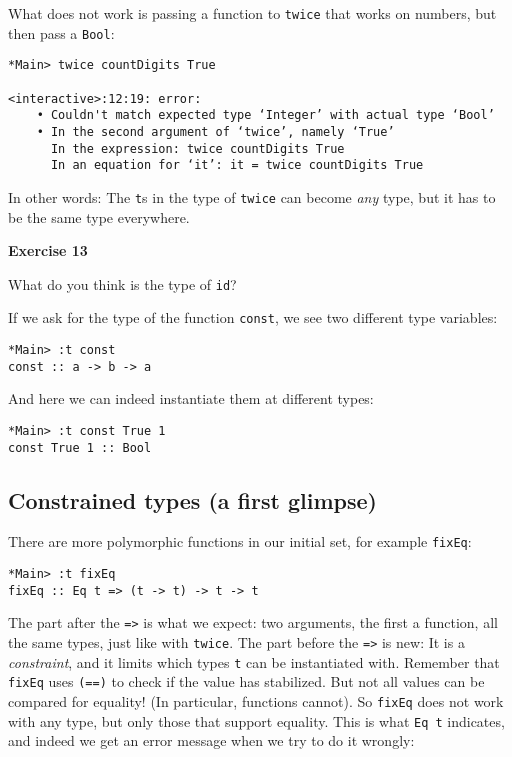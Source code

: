 \documentclass[11pt,
  american,
  DIV13]{article}
\begin{document}
What does not work is passing a function to \texttt{twice} that works on
numbers, but then pass a \texttt{Bool}:

\begin{verbatim}
*Main> twice countDigits True

<interactive>:12:19: error:
    • Couldn't match expected type ‘Integer’ with actual type ‘Bool’
    • In the second argument of ‘twice’, namely ‘True’
      In the expression: twice countDigits True
      In an equation for ‘it’: it = twice countDigits True
\end{verbatim}

In other words: The \texttt{t}s in the type of \texttt{twice} can become
\emph{any} type, but it has to be the same type everywhere.

\textbf{Exercise 13}

What do you think is the type of \texttt{id}?

If we ask for the type of the function \texttt{const}, we see two
different type variables:

\begin{verbatim}
*Main> :t const
const :: a -> b -> a
\end{verbatim}

And here we can indeed instantiate them at different types:

\begin{verbatim}
*Main> :t const True 1
const True 1 :: Bool
\end{verbatim}

\hypertarget{constrained-types-a-first-glimpse}{%
\subsection{Constrained types (a first
glimpse)}\label{constrained-types-a-first-glimpse}}

There are more polymorphic functions in our initial set, for example
\texttt{fixEq}:

\begin{verbatim}
*Main> :t fixEq
fixEq :: Eq t => (t -> t) -> t -> t
\end{verbatim}

The part after the \texttt{=\textgreater{}} is what we expect: two
arguments, the first a function, all the same types, just like with
\texttt{twice}. The part before the \texttt{=\textgreater{}} is new: It
is a \emph{constraint}, and it limits which types \texttt{t} can be
instantiated with. Remember that \texttt{fixEq} uses \texttt{(==)} to
check if the value has stabilized. But not all values can be compared
for equality! (In particular, functions cannot). So \texttt{fixEq} does
not work with any type, but only those that support equality. This is
what \texttt{Eq\ t} indicates, and indeed we get an error message when
we try to do it wrongly:
\end{document}
